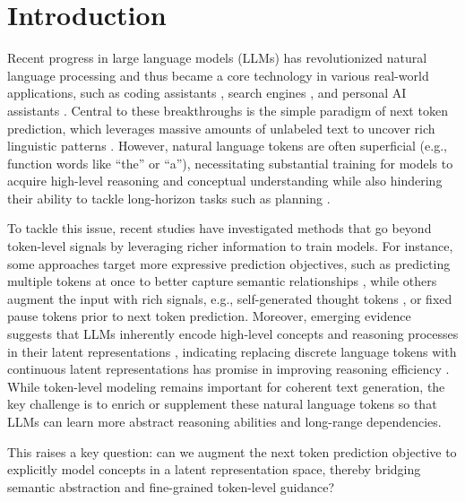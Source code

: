 \documentclass[]{fairmeta}
\title{\llname}
\author[1,2,\dagger]{Jihoon Tack}
\author[1]{Jack Lanchantin}
\author[1]{Jane Yu}
\author[1]{Andrew Cohen}
\author[1]{Ilia Kulikov}
\author[1]{Janice Lan}
\author[1,3,\dagger]{Shibo Hao}
\author[1]{Yuandong Tian}
\author[1]{Jason Weston}
\author[1]{Xian Li}
\affiliation[1]{FAIR at Meta}
\affiliation[2]{KAIST}
\affiliation[3]{UC San Diego}
\date{\today}
\begin{document}
\maketitle

\section{Introduction}
\label{sec:intro}


Recent progress in large language models (LLMs) has revolutionized natural language processing \citep{brown2020language,dubey2024llama} and thus became a core technology in various real-world applications, such as coding assistants \citep{roziere2023codellama}, search engines \citep{xuan2023evaluation}, and personal AI assistants \citep{gao2023assist}. Central to these breakthroughs is the simple paradigm of next token prediction, which leverages massive amounts of unlabeled text to uncover rich linguistic patterns \citep{radford2018improving,radford2019language}. However, natural language tokens are often superficial (e.g., function words like ``the'' or ``a''), necessitating substantial training for models to acquire high-level reasoning and conceptual understanding while also hindering their ability to tackle long-horizon tasks such as planning \citep{lecun2022path,bachmann2024pitfalls}.

To tackle this issue, recent studies have investigated methods that go beyond token-level signals by leveraging richer information to train models. For instance, some approaches target more expressive prediction objectives, such as predicting multiple tokens at once to better capture semantic relationships \citep{gloeckle2024better,liu2024deepseek}, while others augment the input with rich signals, e.g., self-generated thought tokens \citep{zelikman2024quiet}, or fixed pause tokens \citep{goyal2024think} prior to next token prediction. Moreover, emerging evidence suggests that LLMs inherently encode high-level concepts and reasoning processes in their latent representations \citep{deng2023implicit,yang2024large}, indicating replacing discrete language tokens with continuous latent representations has promise in improving reasoning efficiency \citep{hao2024training}. While token-level modeling remains important for coherent text generation, the key challenge is to enrich or supplement these natural language tokens so that LLMs can learn more abstract reasoning abilities and long-range dependencies.

This raises a key question: can we augment the next token prediction objective to explicitly model concepts in a latent representation space, thereby bridging semantic abstraction and fine-grained token-level guidance?
\end{document}
